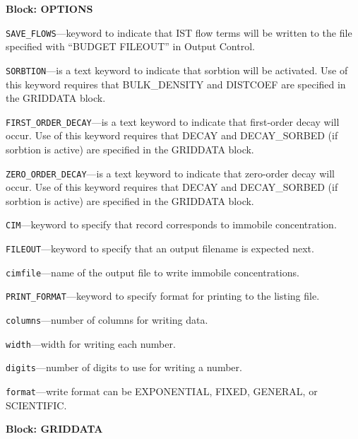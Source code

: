 
\item \textbf{Block: OPTIONS}

\begin{description}
\item \texttt{SAVE\_FLOWS}---keyword to indicate that IST flow terms will be written to the file specified with ``BUDGET FILEOUT'' in Output Control.

\item \texttt{SORBTION}---is a text keyword to indicate that sorbtion will be activated.  Use of this keyword requires that BULK\_DENSITY and DISTCOEF are specified in the GRIDDATA block.

\item \texttt{FIRST\_ORDER\_DECAY}---is a text keyword to indicate that first-order decay will occur.  Use of this keyword requires that DECAY and DECAY\_SORBED (if sorbtion is active) are specified in the GRIDDATA block.

\item \texttt{ZERO\_ORDER\_DECAY}---is a text keyword to indicate that zero-order decay will occur.  Use of this keyword requires that DECAY and DECAY\_SORBED (if sorbtion is active) are specified in the GRIDDATA block.

\item \texttt{CIM}---keyword to specify that record corresponds to immobile concentration.

\item \texttt{FILEOUT}---keyword to specify that an output filename is expected next.

\item \texttt{cimfile}---name of the output file to write immobile concentrations.

\item \texttt{PRINT\_FORMAT}---keyword to specify format for printing to the listing file.

\item \texttt{columns}---number of columns for writing data.

\item \texttt{width}---width for writing each number.

\item \texttt{digits}---number of digits to use for writing a number.

\item \texttt{format}---write format can be EXPONENTIAL, FIXED, GENERAL, or SCIENTIFIC.

\end{description}
\item \textbf{Block: GRIDDATA}

